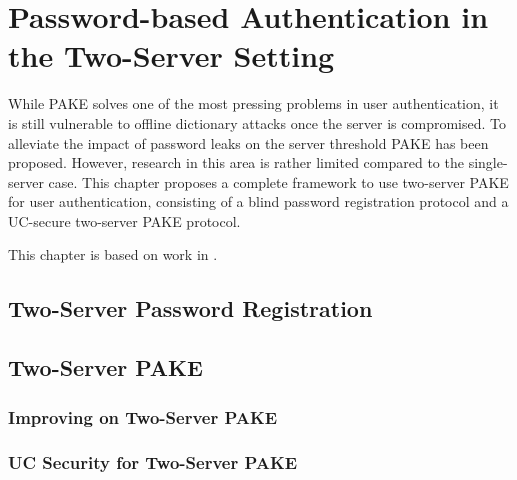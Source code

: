 \chapter{Password-based Authentication in the Two-Server Setting} \label{ch:2pake}

While \ac{PAKE} solves one of the most pressing problems in user authentication, it is still vulnerable to offline dictionary attacks once the server is compromised.
To alleviate the impact of password leaks on the server threshold \ac{PAKE} has been proposed.
However, research in this area is rather limited compared to the single-server case.
This chapter proposes a complete framework to use two-server \ac{PAKE} for user authentication, consisting of a blind password registration protocol and a \ac{UC}-secure two-server \ac{PAKE} protocol.

This chapter is based on work in \cite{KieferM14b,KieferM15b,KieferM15c}.

\section{Two-Server Password Registration} \label{sec:2pake-registration}



\section{Two-Server PAKE} \label{sec:2pake-uc}

\subsection{Improving on Two-Server PAKE}

\subsection{UC Security for Two-Server PAKE}
